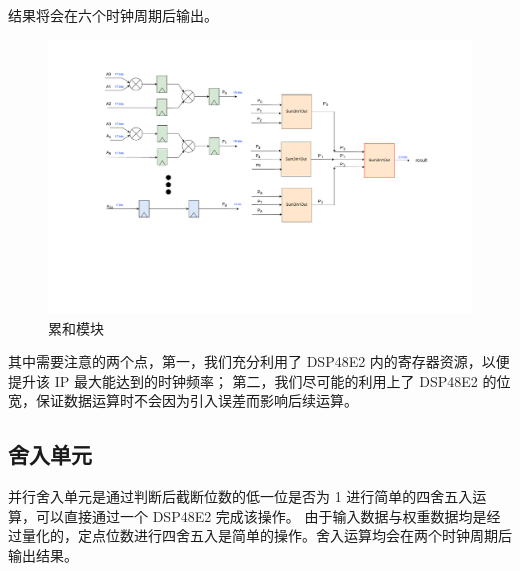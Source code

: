 \documentclass[12pt, a4paper, oneside]{ctexbook}
\begin{document}
	结果将会在六个时钟周期后输出。\par 
		\begin{figure}[h]
		\centering
		\includegraphics[scale=0.52]{pic/sum}
		\caption{累和模块}
		\label{sum}
		\end{figure}
	其中需要注意的两个点，第一，我们充分利用了 DSP48E2 内的寄存器资源，以便提升该 IP 最大能达到的时钟频率；
	第二，我们尽可能的利用上了 DSP48E2 的位宽，保证数据运算时不会因为引入误差而影响后续运算。
	
	\subsection{舍入单元}\label{round_unit}
	并行舍入单元是通过判断后截断位数的低一位是否为 1 进行简单的四舍五入运算，可以直接通过一个 DSP48E2 完成该操作。
	由于输入数据与权重数据均是经过量化的，定点位数进行四舍五入是简单的操作。舍入运算均会在两个时钟周期后输出结果。
		
\end{document}

